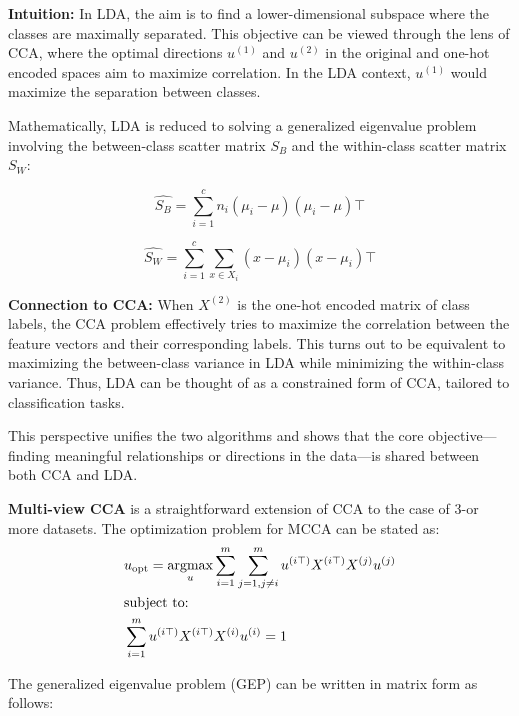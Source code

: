 \textbf{Intuition:} In LDA, the aim is to find a lower-dimensional subspace where the classes are maximally separated. This objective can be viewed through the lens of CCA, where the optimal directions \(u^{(1)}\) and \(u^{(2)}\) in the original and one-hot encoded spaces aim to maximize correlation. In the LDA context, \(u^{(1)}\) would maximize the separation between classes.

Mathematically, LDA is reduced to solving a generalized eigenvalue problem involving the between-class scatter matrix \(S_B\) and the within-class scatter matrix \(S_W\):

\[
    \hat{S_B} = \sum_{i=1}^{c} n_i (\mu_i - \mu)(\mu_i - \mu)\top
\]

\[
    \hat{S_W} = \sum_{i=1}^{c} \sum_{x \in X_i} (x - \mu_i)(x - \mu_i)\top
\]

\textbf{Connection to CCA:} When \(X^{(2)}\) is the one-hot encoded matrix of class labels, the CCA problem effectively tries to maximize the correlation between the feature vectors and their corresponding labels.
This turns out to be equivalent to maximizing the between-class variance in LDA while minimizing the within-class variance.
Thus, LDA can be thought of as a constrained form of CCA, tailored to classification tasks.

This perspective unifies the two algorithms and shows that the core objective—finding meaningful relationships or directions in the data—is shared between both CCA and LDA.

\textbf{Multi-view CCA} is a straightforward extension of CCA to the case of 3-or more datasets.
The optimization problem for MCCA can be stated as:
\begin{align}
     & u_{\text{opt}} = \underset{u}{\mathrm{argmax}} \sum_{i=1}^{m} \sum_{j=1, j \neq i}^{m} u^{(i\top)} X^{(i\top)} X^{(j)} u^{(j)} \\
     & \text{subject to:} \notag \\
     & \sum_{i=1}^{m} u^{(i\top)} X^{(i\top)} X^{(i)} u^{(i)} = 1 \notag
\end{align}

The generalized eigenvalue problem (GEP) can be written in matrix form as follows:


